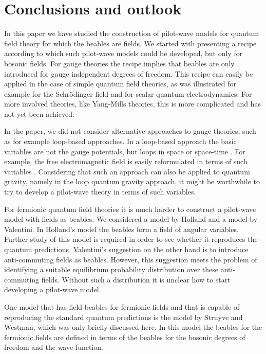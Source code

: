 \documentclass[12pt]{article}
\begin{document}
\section{Conclusions and outlook}
In this paper we have studied the construction of pilot-wave models for quantum field theory for which the beables are fields. We started with presenting a recipe according to which such pilot-wave models could be developed, but only for bosonic fields. For gauge theories the recipe implies that beables are only introduced for gauge independent degrees of freedom. This recipe can easily be applied in the case of simple quantum field theories, as was illustrated for example for the Schr{\"o}\-ding\-er field and for scalar quantum electrodynamics. For more involved theories, like Yang-Mills theories, this is more complicated and has not yet been achieved. 

In the paper, we did not consider alternative approaches to gauge theories, such as for example loop-based approaches. In a loop-based approach the basic variables are not the gauge potentials, but loops in space or space-time \cite{gambini96,rovelli04,thiemann07}. For example, the free electromagnetic field is easily reformulated in terms of such variables \cite{gambini96}. Considering that such an approach can also be applied to quantum gravity, namely in the loop quantum gravity approach, it might be worthwhile to try to develop a pilot-wave theory in terms of such variables. 

For fermionic quantum field theories it is much harder to construct a pilot-wave model with fields as beables. We considered a model by Holland and a model by Valentini. In Holland's model the beables form a field of angular variables. Further study of this model is required in order to see whether it reproduces the quantum predictions. Valentini's suggestion on the other hand is to introduce anti-commuting fields as beables. However, this suggestion meets the problem of identifying a suitable equilibrium probability distribution over these anti-commuting fields. Without such a distribution it is unclear how to start developing a pilot-wave model.

One model that has field beables for fermionic fields and that is capable of reproducing the standard quantum predictions is the model by Struyve and Westman, which was only briefly discussed here. In this model the beables for the fermionic fields are defined in terms of the beables for the bosonic degrees of freedom and the wave function. 
\end{document}
